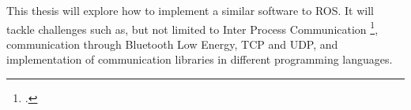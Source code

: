 \medskip

This thesis will explore how to implement a similar software to ROS. It will tackle challenges such as, but not limited
to Inter Process Communication \footcite{ipc-begriff}, communication through Bluetooth Low Energy, TCP and UDP, and
implementation of communication libraries in different programming languages.
